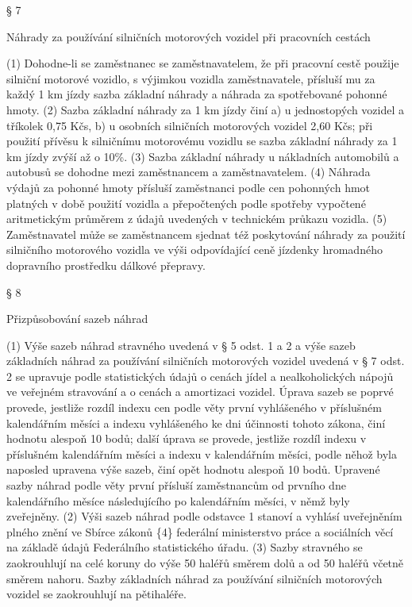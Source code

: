 \documentclass[11pt,a4paper]{article}
\begin{document}
§ 7

Náhrady za používání silničních motorových vozidel při pracovních cestách

(1) Dohodne-li se zaměstnanec se zaměstnavatelem, že při pracovní cestě použije silniční motorové vozidlo, s výjimkou vozidla zaměstnavatele, přísluší mu za každý 1 km jízdy sazba základní náhrady a náhrada za spotřebované pohonné hmoty. (2) Sazba základní náhrady za 1 km jízdy činí a) u jednostopých vozidel a tříkolek 0,75 Kčs, b) u osobních silničních motorových vozidel 2,60 Kčs; při použití přívěsu k silničnímu motorovému vozidlu se sazba základní náhrady za 1 km jízdy zvýší až o 10\%. (3) Sazba základní náhrady u nákladních automobilů a autobusů se dohodne mezi zaměstnancem a zaměstnavatelem. (4) Náhrada výdajů za pohonné hmoty přísluší zaměstnanci podle cen pohonných hmot platných v době použití vozidla a přepočtených podle spotřeby vypočtené aritmetickým průměrem z údajů uvedených v technickém průkazu vozidla. (5) Zaměstnavatel může se zaměstnancem sjednat též poskytování náhrady za použití silničního motorového vozidla ve výši odpovídající ceně jízdenky hromadného dopravního prostředku dálkové přepravy.

§ 8

Přizpůsobování sazeb náhrad

(1) Výše sazeb náhrad stravného uvedená v § 5 odst. 1 a 2 a výše sazeb základních náhrad za používání silničních motorových vozidel uvedená v § 7 odst. 2 se upravuje podle statistických údajů o cenách jídel a nealkoholických nápojů ve veřejném stravování a o cenách a amortizaci vozidel. Úprava sazeb se poprvé provede, jestliže rozdíl indexu cen podle věty první vyhlášeného v příslušném kalendářním měsíci a indexu vyhlášeného ke dni účinnosti tohoto zákona, činí hodnotu alespoň 10 bodů; další úprava se provede, jestliže rozdíl indexu v příslušném kalendářním měsíci a indexu v kalendářním měsíci, podle něhož byla naposled upravena výše sazeb, činí opět hodnotu alespoň 10 bodů. Upravené sazby náhrad podle věty první přísluší zaměstnancům od prvního dne kalendářního měsíce následujícího po kalendářním měsíci, v němž byly zveřejněny. (2) Výši sazeb náhrad podle odstavce 1 stanoví a vyhlásí uveřejněním plného znění ve Sbírce zákonů \{4\} federální ministerstvo práce a sociálních věcí na základě údajů Federálního statistického úřadu. (3) Sazby stravného se zaokrouhlují na celé koruny do výše 50 haléřů směrem dolů a od 50 haléřů včetně směrem nahoru. Sazby základních náhrad za používání silničních motorových vozidel se zaokrouhlují na pětihaléře.
\end{document}
